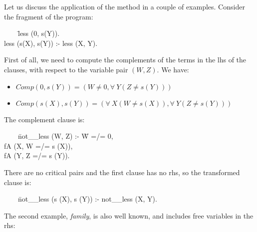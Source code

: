 \documentclass[]{llncs}
\newenvironment{mytabbing}
   {\vspace{0.3em}\begin{small}\begin{tabbing}}
   {\end{tabbing}\end{small}\vspace{0.3em}}
\begin{document}
Let us discuss the application of the method in a couple of
examples. Consider the fragment of the program:

\begin{tt}
\begin{mytabbing}
~~~~\=less (0, s(Y)). \\
    \>less (s(X), s(Y)) :- less (X, Y).
\end{mytabbing}
\end{tt}

First of all, we need to compute the complements of the terms in
the lhs of the clauses, with respect to the variable pair
$(W, Z)$. We have: 
\begin{itemize}
\item $Comp (0, s (Y)) = (W \neq 0, \forall~ Y (Z \neq s (Y)))$
\item $Comp (s (X), s (Y)) = (\forall~ X (W \neq s (X)),
                              \forall~ Y (Z \neq s (Y)))$
\end{itemize}
%
The complement clause is:
\begin{tt}
\begin{mytabbing}
~~~~\=not\_\_less (W, Z) :- \= W =/= 0,   \\
    \>                      \>  fA (X, W =/= s (X)), \\
    \>                      \>  fA (Y, Z =/= s (Y)). 
\end{mytabbing}
\end{tt}
\noindent
There are no critical pairs and the first clause has no rhs, so the
transformed clause is:

\begin{tt}
\begin{mytabbing}
~~~~\=not\_\_less (s (X), s (Y)) :- not\_\_less (X, Y).
\end{mytabbing}
\end{tt}

\noindent
The second example, {\em family}, is also well known, and includes free
variables in the rhs:
\end{document}

